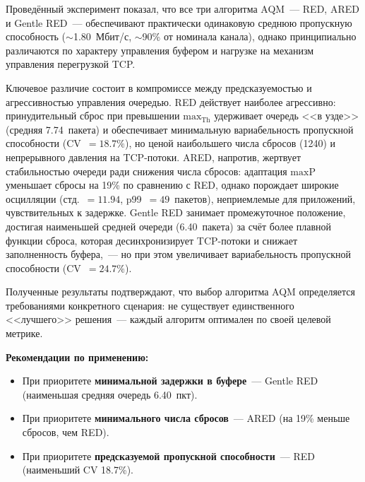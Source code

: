 \documentclass[12pt,a4paper]{article}
\begin{document}
Проведённый эксперимент показал, что все три алгоритма AQM~--- RED, ARED и Gentle RED~--- обеспечивают практически одинаковую среднюю пропускную способность ($\sim$1.80~Мбит/с, $\sim$90\% от номинала канала), однако принципиально различаются по характеру управления буфером и нагрузке на механизм управления перегрузкой TCP.

Ключевое различие состоит в компромиссе между предсказуемостью и агрессивностью управления очередью. RED действует наиболее агрессивно: принудительный сброс при превышении $\mathrm{max}_{\mathrm{Th}}$ удерживает очередь <<в узде>> (средняя 7.74~пакета) и обеспечивает минимальную вариабельность пропускной способности (CV~$= 18.7\%$), но ценой наибольшего числа сбросов (1240) и непрерывного давления на TCP-потоки. ARED, напротив, жертвует стабильностью очереди ради снижения числа сбросов: адаптация $\mathrm{maxP}$ уменьшает сбросы на 19\% по сравнению с RED, однако порождает широкие осцилляции (стд.~$= 11.94$, p99~$= 49$~пакетов), неприемлемые для приложений, чувствительных к задержке. Gentle RED занимает промежуточное положение, достигая наименьшей средней очереди (6.40~пакета) за счёт более плавной функции сброса, которая десинхронизирует TCP-потоки и снижает заполненность буфера,~--- но при этом увеличивает вариабельность пропускной способности (CV~$= 24.7\%$).

Полученные результаты подтверждают, что выбор алгоритма AQM определяется требованиями конкретного сценария: не существует единственного <<лучшего>> решения~--- каждый алгоритм оптимален по своей целевой метрике.

\textbf{Рекомендации по применению:}
\begin{itemize}
  \item При приоритете \textbf{минимальной задержки в буфере}~--- Gentle RED (наименьшая средняя очередь 6.40~пкт).
  \item При приоритете \textbf{минимального числа сбросов}~--- ARED (на 19\% меньше сбросов, чем RED).
  \item При приоритете \textbf{предсказуемой пропускной способности}~--- RED (наименьший CV 18.7\%).
\end{itemize}
\end{document}
